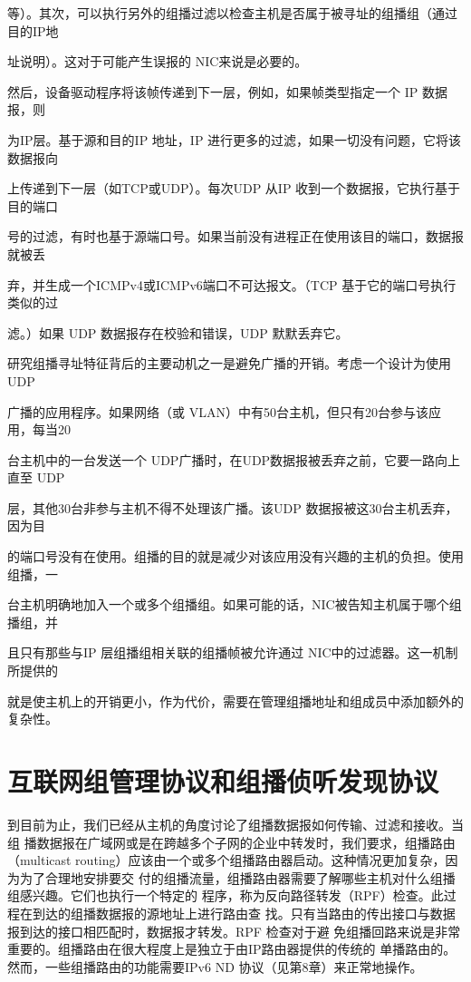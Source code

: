 等）。其次，可以执行另外的组播过滤以检查主机是否属于被寻址的组播组（通过目的IP地

址说明）。这对于可能产生误报的 NIC来说是必要的。

然后，设备驱动程序将该帧传递到下一层，例如，如果帧类型指定一个 IP 数据报，则

为IP层。基于源和目的IP 地址，IP 进行更多的过滤，如果一切没有问题，它将该数据报向

上传递到下一层（如TCP或UDP）。每次UDP 从IP 收到一个数据报，它执行基于目的端口

号的过滤，有时也基于源端口号。如果当前没有进程正在使用该目的端口，数据报就被丢

弃，并生成一个ICMPv4或ICMPv6端口不可达报文。（TCP 基于它的端口号执行类似的过

滤。）如果 UDP 数据报存在校验和错误，UDP 默默丢弃它。

研究组播寻址特征背后的主要动机之一是避免广播的开销。考虑一个设计为使用UDP

广播的应用程序。如果网络（或 VLAN）中有50台主机，但只有20台参与该应用，每当20

台主机中的一台发送一个 UDP广播时，在UDP数据报被丢弃之前，它要一路向上直至 UDP

层，其他30台非参与主机不得不处理该广播。该UDP 数据报被这30台主机丢弃，因为目

的端口号没有在使用。组播的目的就是减少对该应用没有兴趣的主机的负担。使用组播，一

台主机明确地加入一个或多个组播组。如果可能的话，NIC被告知主机属于哪个组播组，并

且只有那些与IP 层组播组相关联的组播帧被允许通过 NIC中的过滤器。这一机制所提供的

就是使主机上的开销更小，作为代价，需要在管理组播地址和组成员中添加额外的复杂性。

\section{互联网组管理协议和组播侦听发现协议}

到目前为止，我们已经从主机的角度讨论了组播数据报如何传输、过滤和接收。当组
播数据报在广域网或是在跨越多个子网的企业中转发时，我们要求，组播路由（multicast
routing）应该由一个或多个组播路由器启动。这种情况更加复杂，因为为了合理地安排要交
付的组播流量，组播路由器需要了解哪些主机对什么组播组感兴趣。它们也执行一个特定的
程序，称为反向路径转发（RPF）检查。此过程在到达的组播数据报的源地址上进行路由查
找。只有当路由的传出接口与数据报到达的接口相匹配时，数据报才转发。RPF 检查对于避
免组播回路来说是非常重要的。组播路由在很大程度上是独立于由IP路由器提供的传统的
单播路由的。然而，一些组播路由的功能需要IPv6 ND 协议（见第8章）来正常地操作。

